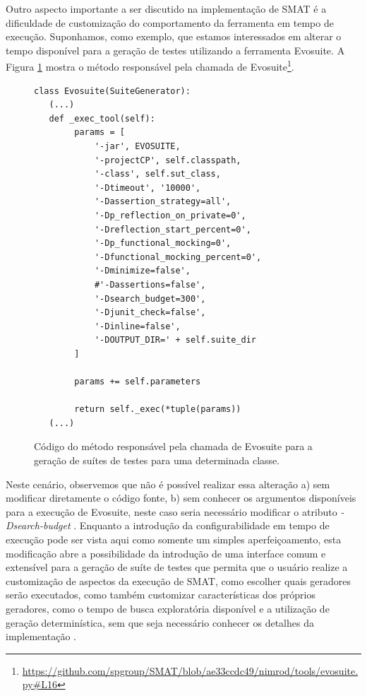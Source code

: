 \documentclass[12pt]{article}
\begin{document}
Outro aspecto importante a ser discutido na implementação de SMAT é a dificuldade de customização do comportamento da ferramenta em tempo de execução. Suponhamos, como exemplo, que estamos interessados em alterar o tempo disponível para a geração de testes utilizando a ferramenta Evosuite. A Figura \ref{fig:evosuite} mostra o método responsável pela chamada de Evosuite\footnote{\href{https://github.com/spgroup/SMAT/blob/ae33ccdc49/nimrod/tools/evosuite.py\#L16}{https://github.com/spgroup/SMAT/blob/ae33ccdc49/nimrod/tools/evosuite.py\#L16}}.

\begin{figure}[H]
    \begin{verbatim}
class Evosuite(SuiteGenerator):
   (...)
   def _exec_tool(self):
        params = [
            '-jar', EVOSUITE,
            '-projectCP', self.classpath,
            '-class', self.sut_class,
            '-Dtimeout', '10000',
            '-Dassertion_strategy=all',
            '-Dp_reflection_on_private=0',
            '-Dreflection_start_percent=0',
            '-Dp_functional_mocking=0',
            '-Dfunctional_mocking_percent=0',
            '-Dminimize=false',
            #'-Dassertions=false',
            '-Dsearch_budget=300',
            '-Djunit_check=false',
            '-Dinline=false',
            '-DOUTPUT_DIR=' + self.suite_dir
        ]
 
        params += self.parameters
 
        return self._exec(*tuple(params))
   (...)
    \end{verbatim}
    \caption{Código do método responsável pela chamada de Evosuite para a geração de suítes de testes para uma determinada classe.}
    \label{fig:evosuite}
\end{figure}

Neste cenário, observemos que não é possível realizar essa alteração a) sem modificar diretamente o código fonte, b) sem conhecer os argumentos disponíveis para a execução de Evosuite, neste caso seria necessário modificar o atributo \textit{-Dsearch-budget} \cite{evosuite:manual}. Enquanto a introdução da configurabilidade em tempo de execução pode ser vista aqui como somente um simples aperfeiçoamento, esta modificação abre a possibilidade da introdução de uma interface comum e extensível para a geração de suíte de testes que permita que o usuário realize a customização de aspectos da execução de SMAT, como escolher quais geradores serão executados, como também customizar características dos próprios geradores, como o tempo de busca exploratória disponível e a utilização de geração determinística, sem que seja necessário conhecer os detalhes da implementação \cite{ousterhout2018philosophy}.
\end{document}
